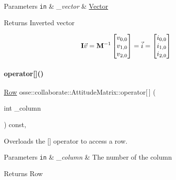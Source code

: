 \begin{DoxyParams}[1]{Parameters}
\mbox{\tt in}  & {\em \+\_\+vector} & \hyperlink{classosse_1_1collaborate_1_1_vector}{Vector} \\
\hline
\end{DoxyParams}
\begin{DoxyReturn}{Returns}
Inverted vector
\end{DoxyReturn}
\[ {\bf{I}}\vec{v} = {\bf{M}}^{-1} \begin{bmatrix} v_{0,0} \\ v_{1,0} \\ v_{2,0} \end{bmatrix} = \vec{i} = \begin{bmatrix} i_{0,0} \\ i_{1,0} \\ i_{2,0} \end{bmatrix} \] \mbox{\label{classosse_1_1collaborate_1_1_attitude_matrix_a424b4876cf18be58ccee7386d91314d7}} 
\paragraph{\texorpdfstring{operator[]()}{operator[]()}}
{\footnotesize\ttfamily \hyperlink{classosse_1_1collaborate_1_1_attitude_matrix_ac9df4bd3f06ab890e74afe62d1891344}{Row} osse\+::collaborate\+::\+Attitude\+Matrix\+::operator\mbox{[}$\,$\mbox{]} (\begin{DoxyParamCaption}\item[{int}]{\+\_\+column }\end{DoxyParamCaption}) const\hspace{0.3cm}{\ttfamily [inline]}, {\ttfamily [private]}}



Overloads the \mbox{[}\mbox{]} operator to access a row. 


\begin{DoxyParams}[1]{Parameters}
\mbox{\tt in}  & {\em \+\_\+column} & The number of the column \\
\hline
\end{DoxyParams}
\begin{DoxyReturn}{Returns}
Row 
\end{DoxyReturn}
\mbox{\label{classosse_1_1collaborate_1_1_attitude_matrix_af8945f566ab44170c579b16662004bd2}} 
